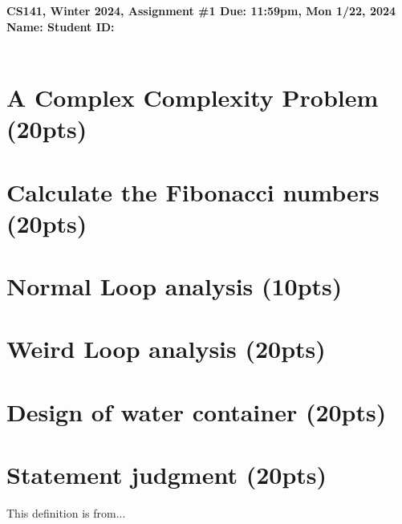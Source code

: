 \documentclass{article}[12pt]
\newcommand{\deadline}{11:59pm, Mon 1/22, 2024}
\newcommand{\assigntitle}[1]{{
  \noindent \large \bf
  CS141, Winter 2024,
  Assignment \##1 \hfill Due: {\deadline}\\
  Name:  %
  \hspace{2.5in}
  Student ID:  %
  \\
  [-.05in]
  \mbox{}\hrulefill \mbox{}\\}}
\begin{document}
\assigntitle{1}{}
\date{}

\section{A Complex Complexity Problem (20pts)}

\newpage
\section{Calculate the Fibonacci numbers (20pts)}

\newpage
\section{Normal Loop analysis (10pts)}

\newpage
\section{Weird Loop analysis (20pts)}

\newpage
\section{Design of water container (20pts)}

\newpage
\section{Statement judgment (20pts)}

\newpage
\begin{thebibliography}{99}
 This definition is from...
\end{thebibliography}
\end{document}
